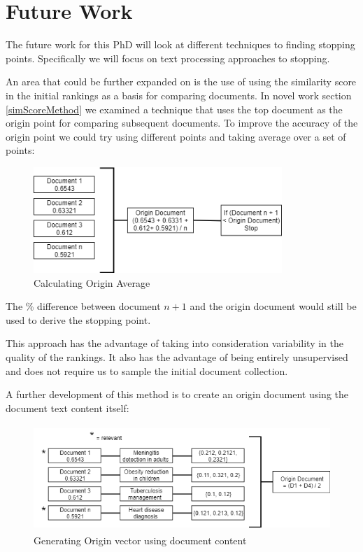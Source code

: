 \chapter{Future Work} \label{fw}

The future work for this PhD will look at different techniques to finding stopping points. Specifically we will focus on text processing approaches to stopping.



An area that could be further expanded on is the use of using the similarity score in the initial rankings as a basis for comparing documents. In novel work section \ref{simScoreMethod} we examined a technique that uses the top document as the origin point for comparing subsequent documents. To improve the accuracy of the origin point we could try using different points and taking average over a set of points:


\begin{figure}[H]
\center
\includegraphics[height=4cm]{figures/originMethod.png}
\caption{Calculating Origin Average}
\end{figure}

The \% difference between document $n+1$ and the origin document would still be used to derive the stopping point.

This approach has the advantage of taking into consideration variability in the quality of the rankings. It also has the advantage of being entirely unsupervised and does not require us to sample the initial document collection. 

A further development of this method is to create an origin document using the document text content itself:

\begin{figure}[H]
\center
\includegraphics[height=4cm]{figures/origin2.png}
\caption{Generating Origin vector using document content}
\end{figure}

